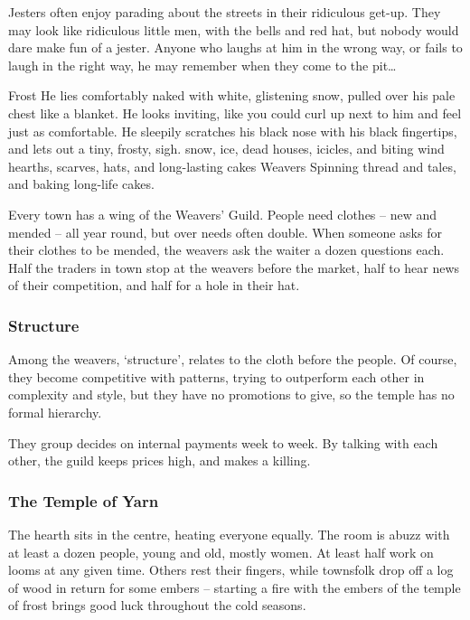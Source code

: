 \begin{multicols}{2}
Jesters often enjoy parading about the streets in their ridiculous get-up.
They may look like ridiculous little men, with the bells and red hat, but nobody would dare make fun of a jester.
Anyone who laughs at him in the wrong way, or fails to laugh in the right way, he may remember when they come to the pit\ldots

  {\hexstar}%
  {Frost}%
  {
    He lies comfortably naked with white, glistening snow, pulled over his pale chest like a blanket.
    He looks inviting, like you could curl up next to him and feel just as comfortable.
    He sleepily scratches his black nose with his black fingertips, and lets out a tiny, frosty, sigh.
  }%
  {snow, ice, dead houses, icicles, and biting wind}%
  {hearths, scarves, hats, and long-lasting cakes}%
  {Weavers}%
  {
    Spinning thread and tales, and baking long-life cakes.
  }%

Every town has a wing of the Weavers' Guild.
People need clothes -- new and mended -- all year round, but over needs often double.
When someone asks for their clothes to be mended, the weavers ask the waiter a dozen questions each.
Half the traders in town stop at the weavers before the market, half to hear news of their competition, and half for a hole in their hat.

\subsubsection{Structure}

Among the weavers, `structure', relates to the cloth before the people.
Of course, they become competitive with patterns, trying to outperform each other in complexity and style, but they have no promotions to give, so the temple has no formal hierarchy.

They group decides on internal payments week to week.
By talking with each other, the guild keeps prices high, and makes a killing.

\subsubsection{The Temple of Yarn}

The hearth sits in the centre, heating everyone equally.
The room is abuzz with at least a dozen people, young and old, mostly women.
At least half work on looms at any given time.
Others rest their fingers, while townsfolk drop off a log of wood in return for some embers -- starting a fire with the embers of the temple of frost brings good luck throughout the cold seasons.


\end{multicols}
